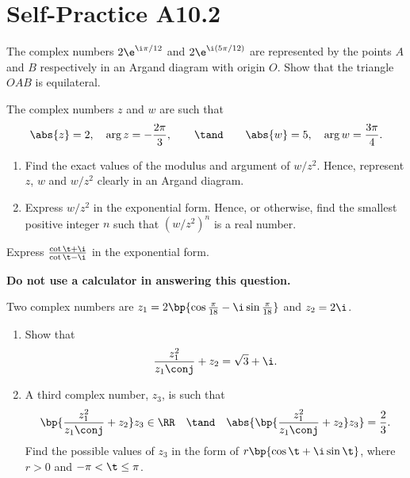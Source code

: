 \section{Self-Practice A10.2}

\begin{problem}
    The complex numbers $2\e^{\i \pi /12}$ and $2\e^{\i (5\pi/12)}$ are represented by the points $A$ and $B$ respectively in an Argand diagram with origin $O$. Show that the triangle $OAB$ is equilateral.
\end{problem}

\begin{problem}
    The complex numbers $z$ and $w$ are such that \[\abs{z} = 2, \quad \arg{z} = -\frac{2\pi}3, \qquad \tand \qquad \abs{w} = 5, \quad \arg{w} = \frac{3\pi}4.\]

    \begin{enumerate}
        \item Find the exact values of the modulus and argument of $w/z^2$. Hence, represent $z$, $w$ and $w/z^2$ clearly in an Argand diagram.
        \item Express $w/z^2$ in the exponential form. Hence, or otherwise, find the smallest positive integer $n$ such that $(w/z^2)^n$ is a real number.
    \end{enumerate}
\end{problem}

\begin{problem}
    Express $\frac{\cot \t + \i}{\cot \t - \i}$ in the exponential form.
\end{problem}

\begin{problem}
    \textbf{Do not use a calculator in answering this question.}

    Two complex numbers are $z_1 = 2\bp{\cos \frac\pi{18} - \i \sin \frac\pi{18}}$ and $z_2 = 2\i$.

    \begin{enumerate}
        \item Show that \[\frac{z_1^2}{z_1\conj} + z_2 = \sqrt3 + \i.\]
        \item A third complex number, $z_3$, is such that \[\bp{\frac{z_1^2}{z_1\conj} + z_2} z_3 \in \RR \quad \tand \quad \abs{\bp{\frac{z_1^2}{z_1\conj} + z_2} z_3} = \frac23.\] Find the possible values of $z_3$ in the form of $r\bp{\cos \t + \i \sin \t}$, where $r > 0$ and $-\pi < \t \leq \pi$.
    \end{enumerate}
\end{problem}

